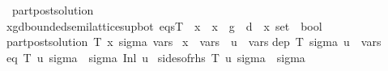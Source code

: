 \begin{isabelle}
\ part\isacharunderscore{}post\isacharunderscore{}solution\ \isacharcolon{}\isacharcolon{}\isanewline
\isaindent{\ \ \ \ }\isachardoublequote{}\isacharparenleft{}\isacharprime{}x\isacharcomma{}\isacharprime{}g\isacharcomma{}\isacharprime{}d\isacharcolon{}\isacharcolon{}bounded\isacharunderscore{}semilattice\isacharunderscore{}sup\isacharunderscore{}bot\isacharparenright{}\ eqsT\ {\isasymRightarrow}\ \isacharprime{}x\ {\isasymRightarrow}\ \isacharparenleft{}\isacharprime{}x\ \isacharplus{}\ \isacharprime{}g\ {\isasymRightarrow}\ \isacharprime{}d\isacharparenright{}\ {\isasymRightarrow}\ \isacharprime{}x\ set\ {\isasymRightarrow}\ bool\isachardoublequote{}\ \isanewline
\isaindent{\ \ }\isachardoublequote{}part\isacharunderscore{}post\isacharunderscore{}solution\ T\ x\ sigma\ vars\ {\isasymequiv}\isanewline
\isaindent{\ \ \ \ }x\ {\isasymin}\ vars\ {\isasymand}\ \isacharparenleft{}{\isasymforall}u\ {\isasymin}\ vars\isachardot{}\isanewline
\isaindent{\ \ \ \ }dep\ T\ sigma\ u\ {\isasymsubseteq}\ vars\ {\isasymand}\isanewline
\isaindent{\ \ \ \ }eq\ T\ u\ sigma\ {\isasymle}\ sigma\ \isacharparenleft{}Inl\ u\isacharparenright{}\ {\isasymand}\isanewline
\isaindent{\ \ \ \ }sides\isacharunderscore{}of\isacharunderscore{}rhs\ \isacharparenleft{}T\ u\isacharparenright{}\ sigma\ {\isasymle}\ sigma\isacharparenright{}\isachardoublequote{}
\end{isabelle}
